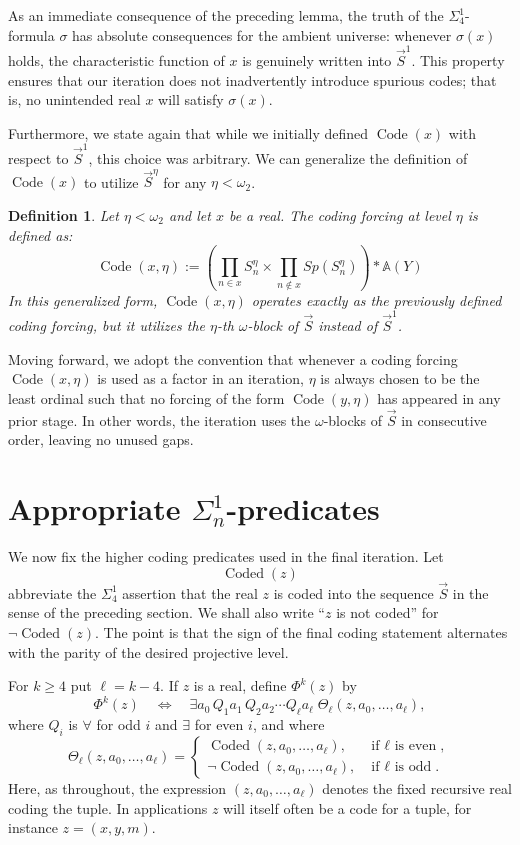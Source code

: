 \documentclass[a4paper,11pt]{article}
\newtheorem{definition}[theorem]{Definition}
\begin{document}
As an immediate consequence of the preceding lemma, the truth of the $\Sigma^1_4$-formula $\sigma$ has absolute consequences for the ambient universe: whenever $\sigma(x)$ holds, the characteristic function of $x$ is genuinely written into $\vec{S}^1$. This property ensures that our iteration does not inadvertently introduce spurious codes; that is, no unintended real $x$ will satisfy $\sigma(x)$.

Furthermore, we state again that while we initially defined $\operatorname{Code}(x)$ with respect to $\vec{S}^1$, this choice was arbitrary. We can generalize the definition of $\operatorname{Code}(x)$ to utilize $\vec{S}^{\eta}$ for any $\eta < \omega_2$.

\begin{definition}
Let $\eta < \omega_2$ and let $x$ be a real. The coding forcing at level $\eta$ is defined as:
\[ \operatorname{Code}(x,\eta) := \left( \prod_{n \in x} S^{\eta}_{n} \times \prod_{n \notin x} Sp(S^{\eta}_n) \right) \ast \mathbb{A}(Y) \]
In this generalized form, $\operatorname{Code}(x,\eta)$ operates exactly as the previously defined coding forcing, but it utilizes the $\eta$-th $\omega$-block of $\vec{S}$ instead of $\vec{S}^1$.
\end{definition}

Moving forward, we adopt the convention that whenever a coding forcing $\operatorname{Code}(x,\eta)$ is used as a factor in an iteration, $\eta$ is always chosen to be the least ordinal such that no forcing of the form $\operatorname{Code}(y,\eta)$ has appeared in any prior stage. In other words, the iteration uses the $\omega$-blocks of $\vec{S}$ in consecutive order, leaving no unused gaps.


\section{Appropriate $\Sigma^1_n$-predicates}\label{sec:appropriate-sigma-predicates}

We now fix the higher coding predicates used in the final iteration.  Let
\[
\operatorname{Coded}(z)
\]
abbreviate the $\Sigma^1_4$ assertion that the real $z$ is coded into the sequence
$\vec S$ in the sense of the preceding section.  We shall also write
``$z$ is not coded'' for $\neg\operatorname{Coded}(z)$.  The point is that the sign of the final coding statement alternates with the parity of the desired projective level.

For $k\geq 4$ put $\ell=k-4$.  If $z$ is a real, define $\Phi^k(z)$ by
\[
\Phi^k(z) \quad\Longleftrightarrow\quad
\exists a_0\, Q_1 a_1\, Q_2 a_2\cdots Q_\ell a_\ell\;
\Theta_\ell(z,a_0,\ldots,a_\ell),
\]
where $Q_i$ is $\forall$ for odd $i$ and $\exists$ for even $i$, and where
\[
\Theta_\ell(z,a_0,\ldots,a_\ell)=
\begin{cases}
\operatorname{Coded}(z,a_0,\ldots,a_\ell), & \text{if $\ell$ is even},\\
\neg\operatorname{Coded}(z,a_0,\ldots,a_\ell), & \text{if $\ell$ is odd}.
\end{cases}
\]
Here, as throughout, the expression $(z,a_0,\ldots,a_\ell)$ denotes the fixed recursive real coding the tuple.  In applications $z$ will itself often be a code for a tuple, for instance $z=(x,y,m)$.
\end{document}
